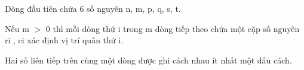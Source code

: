 Dòng đầu tiên chứa 6 số nguyên n, m, p, q, s, t.

Nếu m $>$ 0 thì mỗi dòng thứ i trong m dòng tiếp theo chứa một cặp số nguyên ri , ci xác định vị trí quân thứ i.

Hai số liên tiếp trên cùng một dòng được ghi cách nhau ít nhất một dấu cách.